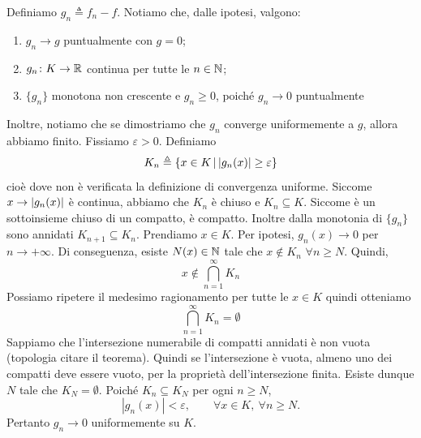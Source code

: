 \documentclass[a4paper]{article}
\begin{document}
\begin{radioactive}
\begin{snippetproof}{}
    Definiamo \(g_n \triangleq f_n - f\).
    Notiamo che, dalle ipotesi, valgono:
    \begin{enumerate}
        \item \(g_n \to g\) puntualmente con \(g=0\);
        \item \(g_n \colon K \to \mathbb{R}\) continua per tutte le \(n\in\mathbb{N}\);
        \item \(\{g_n\}\) monotona non crescente e \(g_n\geq0\), poiché \(g_n\to0\) puntualmente
    \end{enumerate}
    Inoltre, notiamo che se dimostriamo che \(g_n\) converge uniformemente a \(g\), allora abbiamo finito.
    Fissiamo \(\varepsilon>0\). Definiamo
    \[
        K_n \triangleq \left\{
            x \in K \,|\, |g_n(x)| \geq \varepsilon
        \right\}
    \]
    cioè dove non è verificata la definizione di convergenza uniforme.
    Siccome \(x \to |g_n(x)|\) è continua, abbiamo che \(K_n\) è chiuso e \(K_n \subseteq K\).
    Siccome è un sottoinsieme chiuso di un compatto, è compatto. Inoltre dalla monotonia di
    \(\{g_n\}\) sono annidati \(K_{n+1} \subseteq K_n\).
    Prendiamo \(x \in K\). Per ipotesi, \(g_n(x) \to 0\) per \(n \to +\infty\).
    Di conseguenza, esiste \(N(x) \in \mathbb{N}\) tale che \(x \notin K_n\)
    \(\forall n \geq N\).
    Quindi, \[ x\notin\bigcap_{n=1}^\infty K_n \]
    Possiamo ripetere il medesimo ragionamento per tutte le \(x \in K\) quindi otteniamo
    \[
        \bigcap_{n=1}^\infty K_n = \emptyset
    \]
    Sappiamo che l'intersezione numerabile di compatti annidati è non vuota (topologia citare il teorema).
    Quindi se l'intersezione è vuota, almeno uno dei compatti deve essere vuoto, per la proprietà dell'intersezione finita.
    Esiste dunque \(N\) tale che \(K_N=\emptyset\). Poiché \(K_n\subseteq K_N\) per ogni \(n\geq N\),
    \[
        |g_n(x)|<\varepsilon,
        \qquad \forall x\in K,\ \forall n\geq N.
    \]
    Pertanto \(g_n\to0\) uniformemente su \(K\).
\end{snippetproof}
\end{radioactive}
\end{document}
